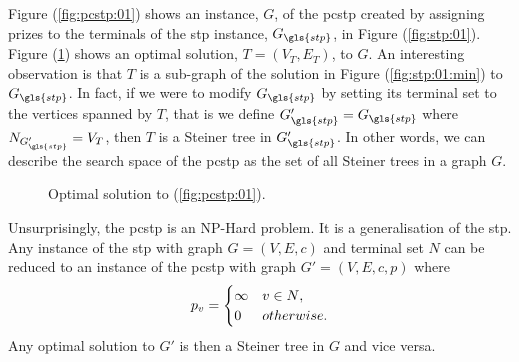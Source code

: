 Figure (\ref{fig:pcstp:01}) shows an instance, $G$, of the \gls{pcstp} created by assigning prizes to the terminals of the \gls{stp} instance, $G_{\gls{stp}}$, in Figure (\ref{fig:stp:01}).
Figure (\ref{fig:pcstp:01:opt})
shows an optimal solution, $T = (V_T, E_T)$, to $G$. An interesting observation is that
$T$ is a sub-graph of the solution in Figure (\ref{fig:stp:01:min}) to $G_{\gls{stp}}$.
In fact, if we were to modify $G_{\gls{stp}}$ by setting its terminal set to the vertices spanned
by $T$, that is we define $G'_{\gls{stp}} =  G_{\gls{stp}}$ where  $N_{G'_{\gls{stp}}} = V_T$, then $T$ is a Steiner
tree in $G'_{\gls{stp}}$. In other words, we can describe the search space of the \gls{pcstp}
 as the set of all Steiner trees in a graph $G$.

\begin{figure}[h]\centering
{}
\caption{Optimal solution to (\ref{fig:pcstp:01})\textnormal{.}}
\label{fig:pcstp:01:opt}
\end{figure}

Unsurprisingly, the \gls{pcstp} is an NP-Hard problem. It is a generalisation of the \gls{stp}. Any instance of
the \gls{stp} with graph $G = (V, E, c)$ and terminal set $N$ can be reduced to an instance of the \gls{pcstp}
with graph $G' = (V, E, c, p)$ where
$$p_v =
\begin{cases}
  \infty & v \in N\mathnormal{,} \\
  0 & \mathnormal{otherwise.}
\end{cases}$$
Any optimal solution to $G'$ is then a Steiner tree in $G$ and vice versa.

